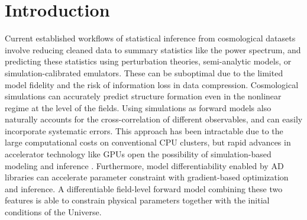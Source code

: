 \documentclass[modern, dvipsnames]{aastex631}
\newcommand{\pmwd}{{\usefont{T1}{nova}{m}{sl}pmwd}}
\begin{document}
\begin{abstract}

Rapid advances in deep learning have brought not only myriad powerful
neural networks, but also breakthroughs that benefit established
scientific research.
In particular, automatic differentiation (AD) tools and computational
accelerators like GPUs have facilitated forward modeling of the Universe
with differentiable simulations.
Based on analytic or automatic backpropagation, current differentiable
cosmological simulations are limited by memory, and thus are subject to
a trade-off between time and space/mass resolution, usually sacrificing
both.
We present a new approach free of such constraints, using the adjoint
method and reverse time integration.
It enables larger and more accurate forward modeling at the field level,
and will improve gradient based optimization and inference.
We implement it in an open-source particle-mesh (PM) $N$-body library
\pmwd\ (particle-mesh with derivatives).
Based on the powerful AD system \texttt{JAX}, \pmwd\ is fully
differentiable, and is highly performant on GPUs.

\clearpage
\end{abstract}



\section{Introduction}

Current established workflows of statistical inference from cosmological
datasets involve reducing cleaned data to summary statistics like the
power spectrum, and predicting these statistics using perturbation
theories, semi-analytic models, or simulation-calibrated emulators.
These can be suboptimal due to the limited model fidelity and the
risk of information loss in data compression.
Cosmological simulations \citep{HockneyEastwood1988, AnguloHahn2022} can
accurately predict structure formation even in the nonlinear regime at
the level of the fields.
Using simulations as forward models also naturally accounts for the
cross-correlation of different observables, and can easily incorporate
systematic errors.
This approach has been intractable due to the large computational costs
on conventional CPU clusters, but rapid advances in accelerator
technology like GPUs open the possibility of simulation-based modeling
and inference \citep{CranmerEtAl2020}.
Furthermore, model differentiability enabled by AD libraries can
accelerate parameter constraint with gradient-based optimization and
inference.
A differentiable field-level forward model combining these two features
is able to constrain physical parameters together with the initial
conditions of the Universe.
\end{document}
